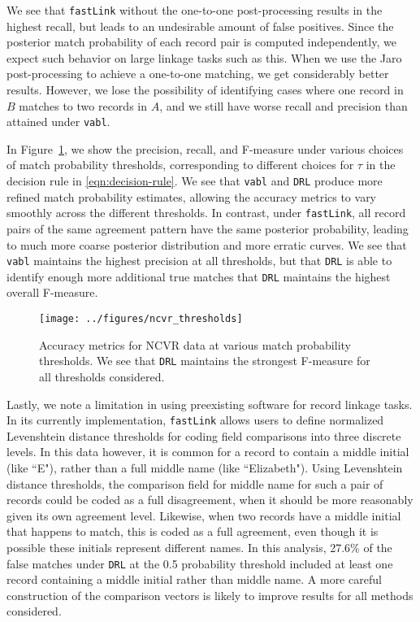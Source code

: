 \documentclass[12pt,letterpaper]{article}
\newcommand{\1}[1]{\mathbb{I}\!\left[#1\right]} %
\begin{document}
We see that \texttt{fastLink} without the one-to-one post-processing results in the highest recall, but leads to an undesirable amount of false positives. Since the posterior match probability of each record pair is computed independently, we expect such behavior on large linkage tasks such as this. When we use the Jaro post-processing to achieve a one-to-one matching, we get considerably better results. However, we lose the possibility of identifying cases where one record in $B$ matches to two records in $A$, and we still have worse recall and precision than attained under \texttt{vabl}. 

In Figure~\ref{fig:ncvr_thresholds}, we show the precision, recall, and F-measure under various choices of match probability thresholds, corresponding to different choices for $\tau$ in the decision rule in \eqref{eqn:decision-rule}. We see that \texttt{vabl} and \texttt{DRL} produce more refined match probability estimates, allowing the accuracy metrics to vary smoothly across the different thresholds. In contrast, under \texttt{fastLink}, all record pairs of the same agreement pattern have the same posterior probability, leading to much more coarse posterior distribution and more erratic curves. We see that \texttt{vabl} maintains the highest precision at all thresholds, but that \texttt{DRL} is able to identify enough more additional true matches that \texttt{DRL} maintains the highest overall F-measure.
\begin{figure}[t]
	\centering
	\texttt{[image: ../figures/ncvr\_thresholds]}
	\caption{Accuracy metrics for NCVR data at various match probability thresholds. We see that \texttt{DRL} maintains the strongest F-measure for all thresholds considered.}
	\label{fig:ncvr_thresholds}
\end{figure}

Lastly, we note a limitation in using preexisting software for record linkage tasks. In its currently implementation, \texttt{fastLink} allows users to define normalized Levenshtein distance thresholds for coding field comparisons into three discrete levels. In this data however, it is common for a record to contain a middle initial (like ``E"), rather than a full middle name (like ``Elizabeth"). Using Levenshtein distance thresholds, the comparison field for middle name for such a pair of records could be coded as a full disagreement, when it should be more reasonably given its own agreement level. Likewise, when two records have a middle initial that happens to match, this is coded as a full agreement, even though it is possible these initials represent different names. In this analysis, 27.6\% of the false matches under \texttt{DRL} at the 0.5 probability threshold included at least one record containing a middle initial rather than middle name. A more careful construction of the comparison vectors is likely to improve results for all methods considered.
\end{document}
